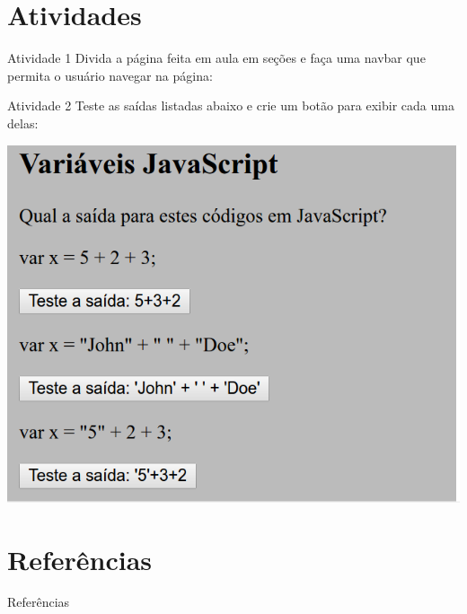 \documentclass{beamer}
\begin{document}
\section{Atividades}
\begin{frame}{Atividade 1}
Divida a página feita em aula em seções e faça uma navbar que permita o usuário navegar na página:

\end{frame}
\begin{frame}{Atividade 2}
Teste as saídas listadas abaixo e crie um botão para exibir cada uma delas:
	\begin{center}
		  \includegraphics[height=0.6\paperheight]{fig/aula4/teste_js.png} \\
	  \end{center}
\end{frame}
\section{Referências}

\begin{frame}{Referências}%
\small
\begin{center}
\tiny


\end{center}
\end{frame}
\end{document}
